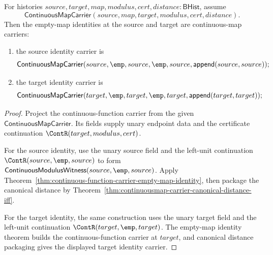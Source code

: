 \begin{theorem}
\label{thm:continuousmap-empty-identity-carriers}
For histories
$source,target,map,modulus,cert,distance:\mathsf{BHist}$,
assume
$$
\mathsf{ContinuousMapCarrier}(source,map,target,modulus,cert,distance).
$$
Then the empty-map identities at the source and target are continuous-map
carriers:
\begin{enumerate}
\item the source identity carrier is
$$
\mathsf{ContinuousMapCarrier}
(source,\emp,source,\emp,source,\mathsf{append}(source,source));
$$

\item the target identity carrier is
$$
\mathsf{ContinuousMapCarrier}
(target,\emp,target,\emp,target,\mathsf{append}(target,target));
$$
\end{enumerate}
\end{theorem}
\begin{proof}
Project the continuous-function carrier from the given
$\mathsf{ContinuousMapCarrier}$. Its fields supply unary endpoint data and the
certificate continuation $\ContR(target,modulus,cert)$.

For the source identity, use the unary source field and the left-unit
continuation $\ContR(source,\emp,source)$ to form
$\mathsf{ContinuousModulusWitness}(source,\emp,source)$. Apply
Theorem~\ref{thm:continuous-function-carrier-empty-map-identity}, then package
the canonical distance by
Theorem~\ref{thm:continuousmap-carrier-canonical-distance-iff}.

For the target identity, the same construction uses the unary target field and
the left-unit continuation $\ContR(target,\emp,target)$. The empty-map identity
theorem builds the continuous-function carrier at $target$, and canonical
distance packaging gives the displayed target identity carrier.
\end{proof}

